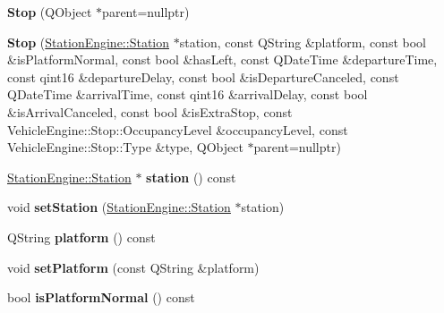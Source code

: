 \begin{DoxyCompactItemize}
\item 
\mbox{\label{classVehicleEngine_1_1Stop_a0fc51aa36267d6fb067d8375d9c171b2}} 
{\bfseries Stop} (Q\+Object $\ast$parent=nullptr)
\item 
\mbox{\label{classVehicleEngine_1_1Stop_aeeccf29d98be9ccbe845a293738fa264}} 
{\bfseries Stop} (\mbox{\hyperlink{classStationEngine_1_1Station}{Station\+Engine\+::\+Station}} $\ast$station, const Q\+String \&platform, const bool \&is\+Platform\+Normal, const bool \&has\+Left, const Q\+Date\+Time \&departure\+Time, const qint16 \&departure\+Delay, const bool \&is\+Departure\+Canceled, const Q\+Date\+Time \&arrival\+Time, const qint16 \&arrival\+Delay, const bool \&is\+Arrival\+Canceled, const bool \&is\+Extra\+Stop, const Vehicle\+Engine\+::\+Stop\+::\+Occupancy\+Level \&occupancy\+Level, const Vehicle\+Engine\+::\+Stop\+::\+Type \&type, Q\+Object $\ast$parent=nullptr)
\item 
\mbox{\label{classVehicleEngine_1_1Stop_adadd380fc70cab6138d8804438f68dfa}} 
\mbox{\hyperlink{classStationEngine_1_1Station}{Station\+Engine\+::\+Station}} $\ast$ {\bfseries station} () const
\item 
\mbox{\label{classVehicleEngine_1_1Stop_a3d9c4cdb63e71499efd6d7b7365c79db}} 
void {\bfseries set\+Station} (\mbox{\hyperlink{classStationEngine_1_1Station}{Station\+Engine\+::\+Station}} $\ast$station)
\item 
\mbox{\label{classVehicleEngine_1_1Stop_a9e41b74478b3170c290821135350744c}} 
Q\+String {\bfseries platform} () const
\item 
\mbox{\label{classVehicleEngine_1_1Stop_a53858d3ec0183e9492b25427d4c694d0}} 
void {\bfseries set\+Platform} (const Q\+String \&platform)
\item 
\mbox{\label{classVehicleEngine_1_1Stop_a665852ce9a856667be28b3adc69f72c3}} 
bool {\bfseries is\+Platform\+Normal} () const
\item 
\mbox{\label{classVehicleEngine_1_1Stop_ae87db218cc65ddff2768e8c7284a3b1e}} 

\end{DoxyCompactItemize}
